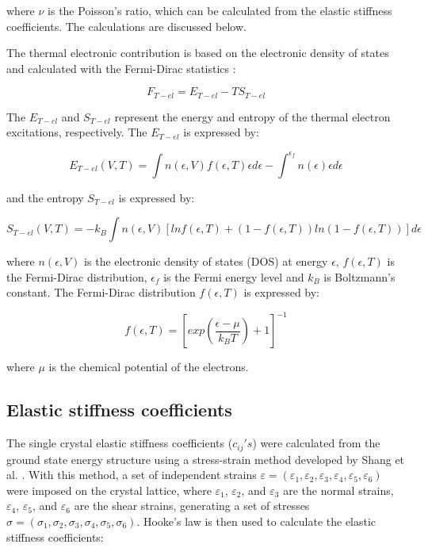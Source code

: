 \noindent where $\nu$ is the Poisson's ratio, which can be calculated from the elastic stiffness coefficients. The calculations are discussed below.

The thermal electronic contribution is based on the electronic density of states and calculated with the Fermi-Dirac statistics \cite{Shang2010,Wang2004}:

\begin{equation}
\label{eq:thermalelectronic}
F_{T-el} = E_{T-el} - T S_{T-el}
\end{equation}

\noindent The $E_{T-el}$ and $S_{T-el}$ represent the energy and entropy of the thermal electron excitations, respectively. The $E_{T-el}$ is expressed by:

\begin{equation}
\label{eq:etel}
E_{T-el} (V,T) = \int n\left(\epsilon, V\right) f \left(\epsilon, T\right) \epsilon d \epsilon - \int^{\epsilon_{f}} n (\epsilon) \epsilon d \epsilon
\end{equation}

\noindent and the entropy $S_{T-el}$ is expressed by:

\begin{equation}
\label{eq:sel}
S_{T-el} (V,T) = -k_{B} \int n(\epsilon, V) \left[ ln f \left(\epsilon,T\right) + \left( 1 - f(\epsilon, T) \right) ln \left( 1 - f \left(\epsilon, T \right) \right) \right] d\epsilon 
\end{equation}

\noindent where $n(\epsilon, V)$ is the electronic density of states (DOS) at energy $\epsilon$,  $f (\epsilon,T)$ is the Fermi-Dirac distribution, $\epsilon_{f}$ is the Fermi energy level and $k_{B}$ is Boltzmann's constant. The Fermi-Dirac distribution $f (\epsilon, T)$ is expressed by:

\begin{equation}
\label{eq:fermidirac}
f (\epsilon,T) = \left[ exp \left( \frac{\epsilon - \mu}{k_{B} T} \right) + 1 \right]^{-1}
\end{equation}

\noindent where $\mu$ is the chemical potential of the electrons. 


\subsection{Elastic stiffness coefficients}

The single crystal elastic stiffness coefficients ($c_{ij}$$'s$) were calculated from the ground state energy structure using a stress-strain method developed by Shang et al. \cite{Shang2007c}. With this method, a set of independent strains $\varepsilon = (\varepsilon_{1}, \varepsilon_{2}, \varepsilon_{3}, \varepsilon_{4}, \varepsilon_{5}, \varepsilon_{6})$ were imposed on the crystal lattice, where $\varepsilon_{1}$, $\varepsilon_{2}$, and $\varepsilon_{3}$ are the normal strains, $\varepsilon_{4}$, $\varepsilon_{5}$, and $\varepsilon_{6}$ are the shear strains, generating a set of stresses $\sigma = (\sigma_{1}, \sigma_{2}, \sigma_{3}, \sigma_{4}, \sigma_{5},\sigma_{6})$. Hooke's law is then used to calculate the elastic stiffness coefficients: 


